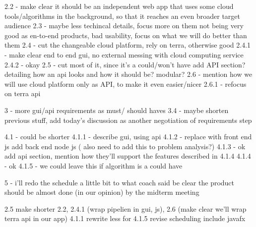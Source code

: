 2.2 - make clear it should be an independent web app that uses some cloud tools/algorithms in the background, so that it reaches an even broader target audience
2.3 - maybe less techincal details, focus more on them not being very good as en-to-end products, bad usability, focus on what we will do better than them
2.4 - cut the changeable cloud platform, rely on terra, otherwise good
2.4.1 - make clear end to end gui, no external messing with cloud computing service
2.4.2 - okay
2.5 - cut most of it, since it's a could/won't have
add API section? detailing how an api looks and how it should be? modular?
2.6 - mention how we will use cloud platform only as API, to make it even easier/nicer
2.6.1 - refocus on terra api

3 - more gui/api requirements as must/ should haves
3.4 - maybe shorten previous stuff, add today's discussion as another negotiation of requirements step

4.1 - could be shorter
4.1.1 - describe gui, using api
4.1.2 - replace with front end js
add back end node js ( also need to add this to problem analysis?)
4.1.3 - ok
add api section, mention how they'll support the features described in 4.1.4
4.1.4 - ok
4.1.5 - we could leave this if algorithm is a could have

5 - i'll redo the schedule a little bit to what coach said
be clear the product should be almost done (in our opinion) by the midterm meeting


2.5 make shorter
2.2, 2.4.1 (wrap pipelien in gui, js), 2.6 (make clear we'll wrap terra api in our app)         
4.1.1 rewrite
less for 4.1.5
revise scheduling
include javafx 